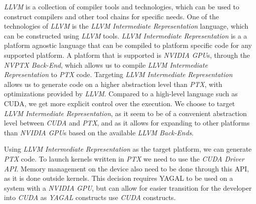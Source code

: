 \textit{LLVM}\cite{llvm} is a collection of compiler tools and technologies, which can be used to construct compilers and other tool chains for specific needs. One of the technologies of \textit{LLVM} is the \textit{LLVM Intermediate Representation} language, which can be constructed using \textit{LLVM} tools. \textit{LLVM Intermediate Representation} is a a platform agnostic language that can be compiled to platform specific code for any supported platform. A platform that is supported is \textit{NVIDIA GPU}s, through the \textit{NVPTX Back-End}, which allows us to compile \textit{LLVM Intermediate Representation} to \textit{PTX} code. Targeting \textit{LLVM Intermediate Representation} allows us to generate code on a higher abstraction level than \textit{PTX}, with optimizations provided by \textit{LLVM}. Compared to a high-level language such as CUDA, we get more explicit control over the execution. We choose to target \textit{LLVM Intermediate Representation}, as it seem to be of a convenient abstraction level between \textit{CUDA} and \textit{PTX}, and as it allows for expanding to other platforms than \textit{NVIDIA GPU}s based on the available \textit{LLVM Back-Ends}.

Using \textit{LLVM Intermediate Representation} as the target platform, we can generate \textit{PTX} code. To launch kernels written in \textit{PTX} we need to use the \textit{CUDA Driver API}. Memory management on the device also need to be done through this API, as it is done outside kernels. This decision requires YAGAL to be used on a system with a \textit{NVIDIA GPU}, but can allow for easier transition for the developer into \textit{CUDA} as \textit{YAGAL} constructs use \textit{CUDA} constructs.